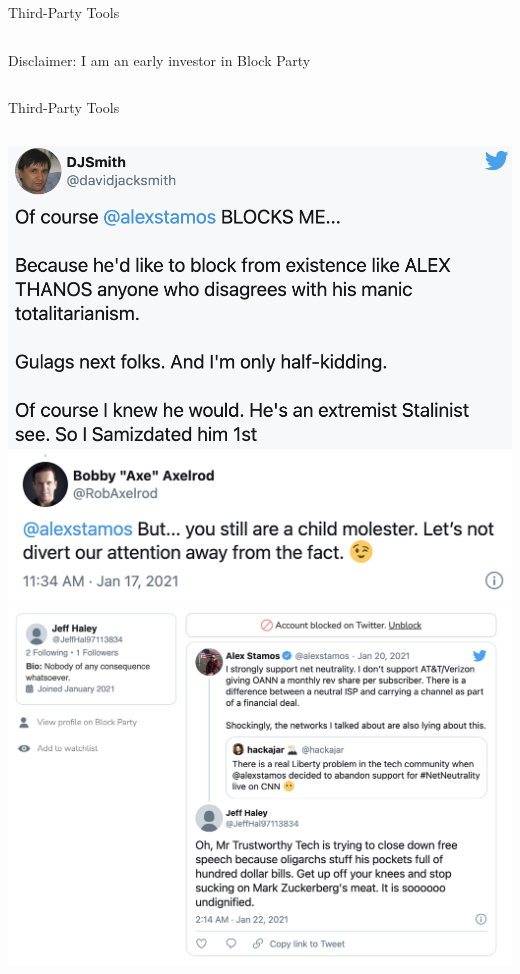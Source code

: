 \documentclass[nobackground,dvipsnames,table,aspectratio=169]{beamer}
\begin{document}
\begin{frame}{Third-Party Tools}
\begin{columns}[T]
            Disclaimer: I am an early investor in Block Party
    \end{columns}
\end{frame}

\begin{frame}{Third-Party Tools}
    \begin{columns}
            \includegraphics[width=\textwidth]{blocked-by-stamos}
            \includegraphics[width=\textwidth]{blocked-by-stamos-3}
            \includegraphics[width=\textwidth]{blocked-by-stamos-2}

\end{columns}
\end{frame}
\end{document}
